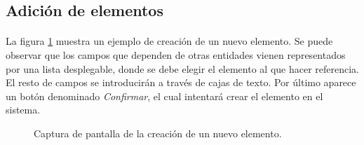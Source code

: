 \subsection{Adición de elementos}

  \paragraph{}La figura \ref{capturaAdicionElementos} muestra un ejemplo de
  creación de un nuevo elemento. Se puede observar que los campos que dependen
  de otras entidades vienen representados por una lista desplegable, donde se
  debe elegir el elemento al que hacer referencia. El resto de campos se
  introducirán a través de cajas de texto. Por último aparece un botón
  denominado \textit{Confirmar}, el cual intentará crear el elemento en el
  sistema.

  \begin{figure}[!ht]
    \begin{center}
      \caption{Captura de pantalla de la creación de un nuevo elemento.}
      \label{capturaAdicionElementos}
    \end{center}
  \end{figure}
